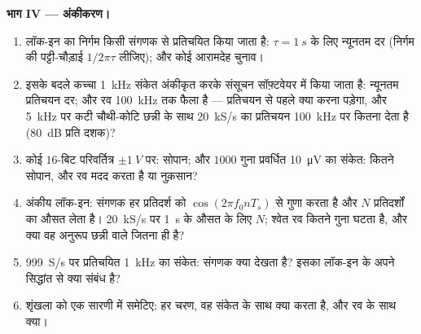 \begin{problem}[{सप्ताहांत समस्या --- संदर्भ दोलित्र से अंकीकृत परिणाम
तक: एक मिलीवोल्ट रव के नीचे दबे दस माइक्रोवोल्ट के प्रकाश-संकेत को
नापना}]
\medskip
\noindent\textbf{भाग IV --- अंकीकरण।}
\begin{enumerate}[resume]
  \item लॉक-इन का निर्गम किसी संगणक से प्रतिचयित किया जाता है:
        $\tau = \qty{1}{s}$ के लिए न्यूनतम दर (निर्गम की पट्टी-चौड़ाई $1/2\pi\tau$ लीजिए); और कोई
        आरामदेह चुनाव।
  \item इसके बदले कच्चा \qty{1}{kHz} संकेत अंकीकृत करके संसूचन
        सॉफ़्टवेयर में किया जाता है: न्यूनतम प्रतिचयन दर; और रव
        \qty{100}{kHz} तक फैला है --- प्रतिचयन से पहले क्या करना पड़ेगा,
        और \qty{5}{kHz} पर कटी चौथी-कोटि छन्नी के साथ \qty{20}{kS/s} का प्रतिचयन
        \qty{100}{kHz} पर कितना  देता है
        (\qty{80}{dB} प्रति दशक)?
  \item कोई $16$-बिट परिवर्तित्र $\pm\qty{1}{V}$ पर: सोपान; और $1000$ गुना
        प्रवर्धित \qty{10}{\micro V} का संकेत: कितने सोपान, और रव
        मदद करता है या नुक़सान?
  \item अंकीय लॉक-इन: संगणक हर प्रतिदर्श को
        $\cos(2\pi f_0nT_s)$ से गुणा करता है और $N$ प्रतिदर्शों का औसत लेता है। \qty{20}{kS/s} पर
        \qty{1}{s} के औसत के लिए $N$; श्वेत रव कितने गुना
        घटता है, और क्या वह अनुरूप छन्नी वाले जितना ही है?
  \item \qty{999}{S/s} पर प्रतिचयित \qty{1}{kHz} का संकेत: संगणक क्या
        देखता है? इसका लॉक-इन के अपने सिद्धांत से क्या
        संबंध है?
  \item शृंखला को एक सारणी में समेटिए: हर चरण, वह संकेत के साथ क्या करता है,
        और रव के साथ क्या।
\end{enumerate}
\end{problem}
